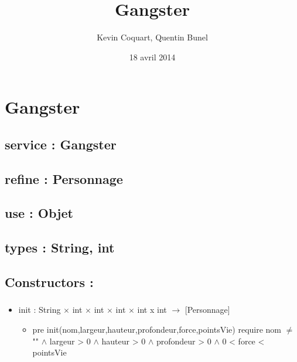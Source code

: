 \documentclass[11pt]{article}
\title{Gangster}
\author{Kevin Coquart, Quentin Bunel}
\date{18 avril 2014}
\begin{document}
\maketitle

\setcounter{tocdepth}{3}
\tableofcontents
\vspace*{1cm}
\section{Gangster}
\label{sec-1}

\subsection{service : Gangster}
\label{sec-1.1}

\subsection{refine : Personnage}
\label{sec-1.2}

\subsection{use : Objet}
\label{sec-1.3}

\subsection{types : String, int}
\label{sec-1.4}


\subsection{Constructors :}
\label{sec-1.5}

\subsubsection{}

\begin{itemize}

\item init : String $\times$ int $\times$ int $\times$ int $\times$ int x int $\to$ [Personnage]\\
\label{sec-1.5.1.1}

\begin{itemize}

\item pre init(nom,largeur,hauteur,profondeur,force,pointsVie) require nom $\neq$ "" $\wedge$ largeur > 0 $\wedge$ hauteur > 0 $\wedge$ profondeur > 0 $\wedge$ 0 < force < pointsVie\\
\label{sec-1.5.1.1.1}

\end{itemize} %
\end{itemize} %
\end{document}
